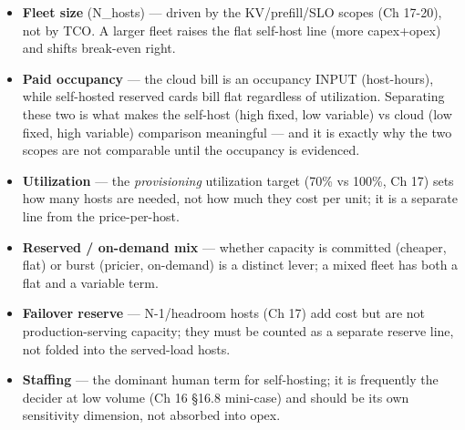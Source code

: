 \begin{itemize}
\tightlist
\item
  \textbf{Fleet size} (N\_hosts) --- driven by the KV/prefill/SLO scopes
  (Ch 17-20), not by TCO. A larger fleet raises the flat self-host line
  (more capex+opex) and shifts break-even right.
\item
  \textbf{Paid occupancy} --- the cloud bill is an occupancy INPUT
  (host-hours), while self-hosted reserved cards bill flat regardless of
  utilization. Separating these two is what makes the self-host (high
  fixed, low variable) vs cloud (low fixed, high variable) comparison
  meaningful --- and it is exactly why the two scopes are not comparable
  until the occupancy is evidenced.
\item
  \textbf{Utilization} --- the \emph{provisioning} utilization target
  (70\% vs 100\%, Ch 17) sets how many hosts are needed, not how much
  they cost per unit; it is a separate line from the price-per-host.
\item
  \textbf{Reserved / on-demand mix} --- whether capacity is committed
  (cheaper, flat) or burst (pricier, on-demand) is a distinct lever; a
  mixed fleet has both a flat and a variable term.
\item
  \textbf{Failover reserve} --- N-1/headroom hosts (Ch 17) add cost but
  are not production-serving capacity; they must be counted as a
  separate reserve line, not folded into the served-load hosts.
\item
  \textbf{Staffing} --- the dominant human term for self-hosting; it is
  frequently the decider at low volume (Ch 16 §16.8 mini-case) and
  should be its own sensitivity dimension, not absorbed into opex.
\end{itemize}


